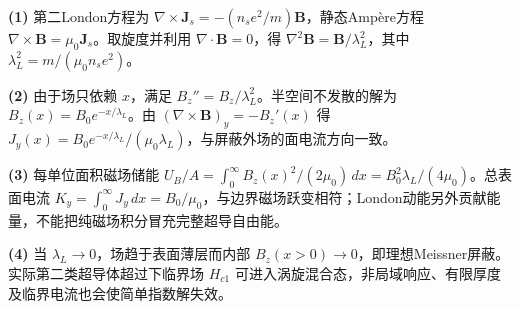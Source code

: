 \par\noindent\textbf{(1)} 第二London方程为 \(\nabla\times\boldsymbol J_s=-(n_se^2/m)\boldsymbol B\)，静态Ampère方程 \(\nabla\times\boldsymbol B=\mu_0\boldsymbol J_s\)。取旋度并利用 \(\nabla\cdot\boldsymbol B=0\)，得 \(\nabla^2\boldsymbol B=\boldsymbol B/\lambda_L^2\)，其中 \(\lambda_L^2=m/(\mu_0n_se^2)\)。
\par\noindent\textbf{(2)} 由于场只依赖 \(x\)，满足 \(B_z''=B_z/\lambda_L^2\)。半空间不发散的解为 \(B_z(x)=B_0e^{-x/\lambda_L}\)。由 \((\nabla\times\boldsymbol B)_y=-B_z'(x)\) 得 \(J_y(x)=B_0e^{-x/\lambda_L}/(\mu_0\lambda_L)\)，与屏蔽外场的面电流方向一致。
\par\noindent\textbf{(3)} 每单位面积磁场储能 \(U_B/A=\int_0^\infty B_z(x)^2/(2\mu_0)\,dx=B_0^2\lambda_L/(4\mu_0)\)。总表面电流 \(K_y=\int_0^\infty J_y\,dx=B_0/\mu_0\)，与边界磁场跃变相符；London动能另外贡献能量，不能把纯磁场积分冒充完整超导自由能。
\par\noindent\textbf{(4)} 当 \(\lambda_L\to0\)，场趋于表面薄层而内部 \(B_z(x>0)\to0\)，即理想Meissner屏蔽。实际第二类超导体超过下临界场 \(H_{c1}\) 可进入涡旋混合态，非局域响应、有限厚度及临界电流也会使简单指数解失效。
